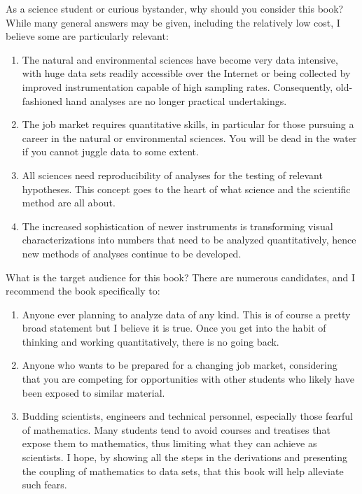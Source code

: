 As a science student or curious bystander, why should you consider this book?  While many
general answers may be given, including the relatively low cost, I believe some are particularly relevant:

\begin{enumerate}
\item The natural and environmental sciences have become very data intensive, with huge data sets readily accessible
   over the Internet or being collected by improved instrumentation capable of high sampling rates.  Consequently, old-fashioned
   hand analyses are no longer practical undertakings.
\item The job market requires quantitative skills, in particular for those pursuing a career in the natural
   or environmental sciences.  You will be dead in the water if you cannot juggle data to some extent.
\item All sciences need reproducibility of analyses for the testing of relevant hypotheses.
   This concept goes to the heart of what science and the scientific method are all about.
\item The increased sophistication of newer instruments is transforming visual
   characterizations into numbers that need to be analyzed quantitatively, hence new methods of analyses
   continue to be developed.
\end{enumerate}

What is the target audience for this book?  There are numerous candidates,
and I recommend the book specifically to:

\begin{enumerate}
\item Anyone ever planning to analyze data of any kind. This is of course a pretty broad statement but I believe it is true.
   Once you get into the habit of thinking and working quantitatively, there is no going back.
\item Anyone who wants to be prepared for a changing job market, considering that you are competing for
   opportunities with other students who likely have been exposed to similar material.
\item Budding scientists, engineers and technical personnel, especially those fearful of mathematics. Many students
   tend to avoid courses and treatises that expose them to mathematics, thus limiting what they
   can achieve as scientists.  I hope, by showing all the steps in the derivations and presenting the coupling of
   mathematics to data sets, that this book will help alleviate such fears.
\end{enumerate}

